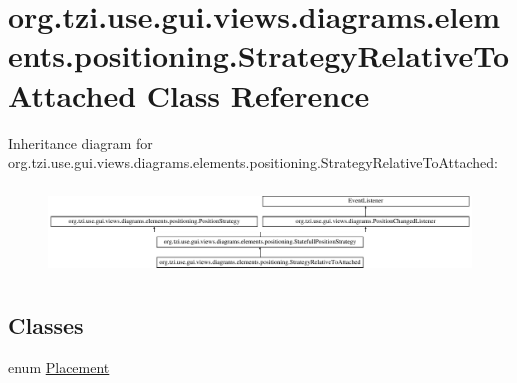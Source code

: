 \hypertarget{classorg_1_1tzi_1_1use_1_1gui_1_1views_1_1diagrams_1_1elements_1_1positioning_1_1_strategy_relative_to_attached}{\section{org.\-tzi.\-use.\-gui.\-views.\-diagrams.\-elements.\-positioning.\-Strategy\-Relative\-To\-Attached Class Reference}
\label{classorg_1_1tzi_1_1use_1_1gui_1_1views_1_1diagrams_1_1elements_1_1positioning_1_1_strategy_relative_to_attached}
}
Inheritance diagram for org.\-tzi.\-use.\-gui.\-views.\-diagrams.\-elements.\-positioning.\-Strategy\-Relative\-To\-Attached\-:\begin{figure}[H]
\begin{center}
\leavevmode
\includegraphics[height=2.393162cm]{classorg_1_1tzi_1_1use_1_1gui_1_1views_1_1diagrams_1_1elements_1_1positioning_1_1_strategy_relative_to_attached}
\end{center}
\end{figure}
\subsection*{Classes}
\begin{DoxyCompactItemize}
\item 
enum \hyperlink{enumorg_1_1tzi_1_1use_1_1gui_1_1views_1_1diagrams_1_1elements_1_1positioning_1_1_strategy_relative_to_attached_1_1_placement}{Placement}
\end{DoxyCompactItemize}
